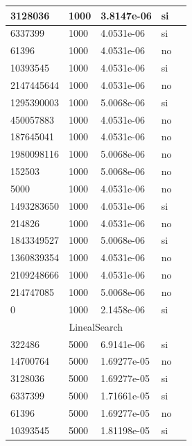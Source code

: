 \documentclass[12pt, fleqn]{article}                             %
\theoremstyle{break}                                            %
\begin{document}
\begin{longtable}{|m{5em}|m{5em}|m{10em}|m{5em}|@{}m{0pt}@{}}
            3128036& 1000  & 3.8147e-06 & si &\\[1em]    \hline
            6337399& 1000  & 4.0531e-06 & si &\\[1em]    \hline
            61396& 1000  & 4.0531e-06 & no &\\[1em]    \hline
            10393545& 1000  & 4.0531e-06 & si &\\[1em]    \hline
            2147445644& 1000  & 4.0531e-06 & no &\\[1em]    \hline
            1295390003& 1000  & 5.0068e-06 & si &\\[1em]    \hline
            450057883& 1000  & 4.0531e-06 & no &\\[1em]    \hline
            187645041& 1000  & 4.0531e-06 & no &\\[1em]    \hline
            1980098116& 1000  & 5.0068e-06 & no &\\[1em]    \hline
            152503& 1000  & 5.0068e-06 & no &\\[1em]    \hline
            5000& 1000  & 4.0531e-06 & no &\\[1em]    \hline
            1493283650& 1000  & 4.0531e-06 & si &\\[1em]    \hline
            214826& 1000  & 4.0531e-06 & no &\\[1em]    \hline
            1843349527& 1000  & 5.0068e-06 & si &\\[1em]    \hline
            1360839354& 1000  & 4.0531e-06 & no &\\[1em]    \hline
            2109248666& 1000  & 4.0531e-06 & no &\\[1em]    \hline
            214747085& 1000  & 5.0068e-06 & no &\\[1em]    \hline
            0& 1000  & 2.1458e-06 & si &\\[1em]    \hline
            \multicolumn{5}{|c|}{LinealSearch}   \\          \hline
            322486& 5000  & 6.9141e-06 & si &\\[1em]    \hline
            14700764& 5000  & 1.69277e-05 & no &\\[1em]    \hline
            3128036& 5000  & 1.69277e-05 & si &\\[1em]    \hline
            6337399& 5000  & 1.71661e-05 & si &\\[1em]    \hline
            61396& 5000  & 1.69277e-05 & no &\\[1em]    \hline
            10393545& 5000  & 1.81198e-05 & si &\\[1em]    \hline

\end{longtable}
\end{document}
